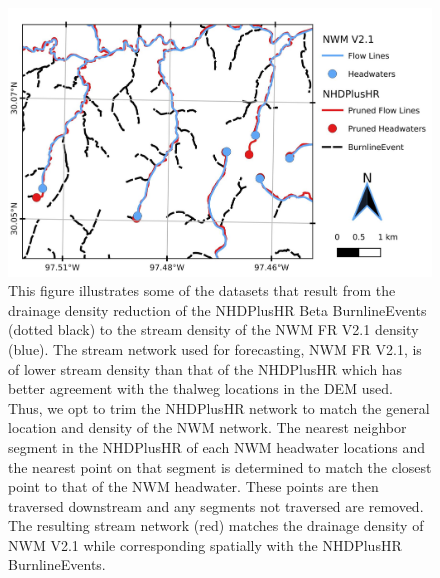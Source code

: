 \begin{figure}[H]
\centering
\includegraphics[scale=1.0]{figures/headwaters.jpg}
\caption{This figure illustrates some of the datasets that result from the drainage density reduction of the NHDPlusHR Beta BurnlineEvents (dotted black) to the stream density of the NWM FR V2.1 density (blue).
The stream network used for forecasting, NWM FR V2.1, is of lower stream density than that of the NHDPlusHR which has better agreement with the thalweg locations in the DEM used.
Thus, we opt to trim the NHDPlusHR network to match the general location and density of the NWM network.
The nearest neighbor segment in the NHDPlusHR of each NWM headwater locations and the nearest point on that segment is determined to match the closest point to that of the NWM headwater.
These points are then traversed downstream and any segments not traversed are removed.
The resulting stream network (red) matches the drainage density of NWM V2.1 while corresponding spatially with the NHDPlusHR BurnlineEvents.}
\label{fig:stream_density_pruning}
\end{figure}
%

